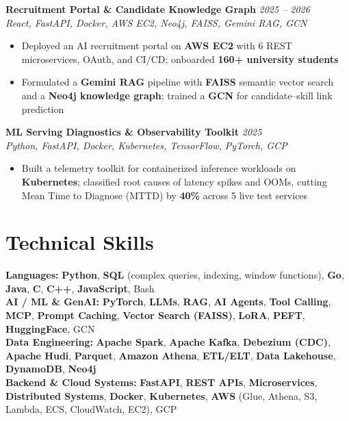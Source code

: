 \documentclass[10pt]{article}
\begin{document}
\textbf{Recruitment Portal \& Candidate Knowledge Graph} \hfill \href{https://github.com/username/portal}{\faGithub} \textcolor{subheadingcolor}{\textit{2025 -- 2026}} \\
\textit{React, FastAPI, Docker, AWS EC2, Neo4j, FAISS, Gemini RAG, GCN}
\begin{itemize}
    \item Deployed an AI recruitment portal on \textbf{AWS EC2} with 6 REST microservices, OAuth, and CI/CD; onboarded \textbf{160+ university students}
    \item Formulated a \textbf{Gemini RAG} pipeline with \textbf{FAISS} semantic vector search and a \textbf{Neo4j knowledge graph}; trained a \textbf{GCN} for candidate--skill link prediction
\end{itemize}
\vspace{-0.25em}

\textbf{ML Serving Diagnostics \& Observability Toolkit} \hfill \href{https://github.com/username/ml-monitoring}{\faGithub} \textcolor{subheadingcolor}{\textit{2025}} \\
\textit{Python, FastAPI, Docker, Kubernetes, TensorFlow, PyTorch, GCP}
\begin{itemize}
    \item Built a telemetry toolkit for containerized inference workloads on \textbf{Kubernetes}; classified root causes of latency spikes and OOMs, cutting Mean Time to Diagnose (MTTD) by \textbf{40\%} across 5 live test services
\end{itemize}
\vspace{-0.45em}

\section*{Technical Skills}
\textbf{Languages:} \textbf{Python}, \textbf{SQL} (complex queries, indexing, window functions), \textbf{Go}, \textbf{Java}, \textbf{C}, \textbf{C++}, \textbf{JavaScript}, Bash \\
\textbf{AI / ML \& GenAI:} \textbf{PyTorch}, \textbf{LLMs}, \textbf{RAG}, \textbf{AI Agents}, \textbf{Tool Calling}, \textbf{MCP}, \textbf{Prompt Caching}, \textbf{Vector Search (FAISS)}, \textbf{LoRA}, \textbf{PEFT}, \textbf{HuggingFace}, GCN \\
\textbf{Data Engineering:} \textbf{Apache Spark}, \textbf{Apache Kafka}, \textbf{Debezium (CDC)}, \textbf{Apache Hudi}, \textbf{Parquet}, \textbf{Amazon Athena}, \textbf{ETL/ELT}, \textbf{Data Lakehouse}, \textbf{DynamoDB}, \textbf{Neo4j} \\
\textbf{Backend \& Cloud Systems:} \textbf{FastAPI}, \textbf{REST APIs}, \textbf{Microservices}, \textbf{Distributed Systems}, \textbf{Docker}, \textbf{Kubernetes}, \textbf{AWS} (Glue, Athena, S3, Lambda, ECS, CloudWatch, EC2), GCP
\vspace{-0.35em}
\end{document}

